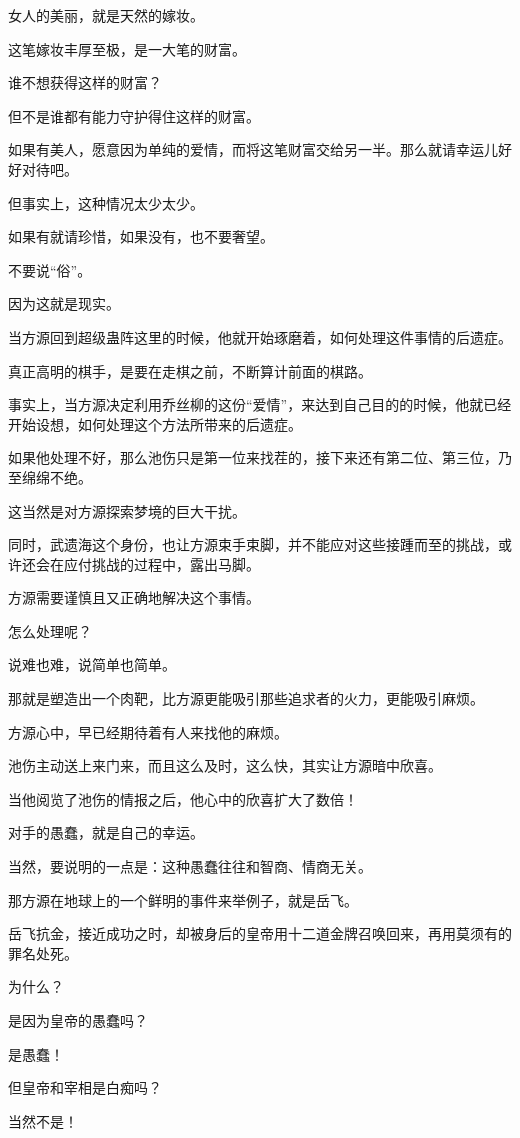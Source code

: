 \begin{this_body}
女人的美丽，就是天然的嫁妆。

这笔嫁妆丰厚至极，是一大笔的财富。

谁不想获得这样的财富？

但不是谁都有能力守护得住这样的财富。

如果有美人，愿意因为单纯的爱情，而将这笔财富交给另一半。那么就请幸运儿好好对待吧。

但事实上，这种情况太少太少。

如果有就请珍惜，如果没有，也不要奢望。

不要说“俗”。

因为这就是现实。

当方源回到超级蛊阵这里的时候，他就开始琢磨着，如何处理这件事情的后遗症。

真正高明的棋手，是要在走棋之前，不断算计前面的棋路。

事实上，当方源决定利用乔丝柳的这份“爱情”，来达到自己目的的时候，他就已经开始设想，如何处理这个方法所带来的后遗症。

如果他处理不好，那么池伤只是第一位来找茬的，接下来还有第二位、第三位，乃至绵绵不绝。

这当然是对方源探索梦境的巨大干扰。

同时，武遗海这个身份，也让方源束手束脚，并不能应对这些接踵而至的挑战，或许还会在应付挑战的过程中，露出马脚。

方源需要谨慎且又正确地解决这个事情。

怎么处理呢？

说难也难，说简单也简单。

那就是塑造出一个肉靶，比方源更能吸引那些追求者的火力，更能吸引麻烦。

方源心中，早已经期待着有人来找他的麻烦。

池伤主动送上来门来，而且这么及时，这么快，其实让方源暗中欣喜。

当他阅览了池伤的情报之后，他心中的欣喜扩大了数倍！

对手的愚蠢，就是自己的幸运。

当然，要说明的一点是：这种愚蠢往往和智商、情商无关。

那方源在地球上的一个鲜明的事件来举例子，就是岳飞。

岳飞抗金，接近成功之时，却被身后的皇帝用十二道金牌召唤回来，再用莫须有的罪名处死。

为什么？

是因为皇帝的愚蠢吗？

是愚蠢！

但皇帝和宰相是白痴吗？

当然不是！


\end{this_body}
